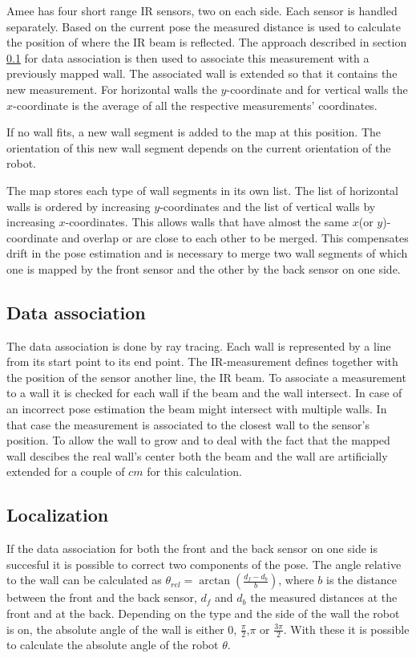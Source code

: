 Amee has four short range IR sensors, two on each side. Each sensor is handled separately. Based on the current pose the measured distance is used to calculate the position of where the IR beam is reflected. The approach described in section \ref{subsec:dataAssoc} for data association is then used to associate this measurement with a previously mapped wall. The associated wall is extended so that it contains the new measurement. For horizontal walls the $y$-coordinate and for vertical walls the $x$-coordinate is the average of all the respective measurements' coordinates. 

If no wall fits, a new wall segment is added to the map at this position. The orientation of this new wall segment depends on the current orientation of the robot.

The map stores each type of wall segments in its own list. The list of horizontal walls is ordered by increasing $y$-coordinates and the list of vertical walls by increasing $x$-coordinates. This allows walls that have almost the same $x$(or $y$)-coordinate and overlap or are close to each other to be merged. This compensates drift in the pose estimation and is necessary to merge two wall segments of which one is mapped by the front sensor and the other by the back sensor on one side. 

\subsection{Data association}
\label{subsec:dataAssoc}
The data association is done by ray tracing. Each wall is represented by a line from its start point to its end point. The IR-measurement defines together with the position of the sensor another line, the IR beam. To associate a measurement to a wall it is checked for each wall if the beam and the wall intersect. In case of an incorrect pose estimation the beam might intersect with multiple walls. In that case the measurement is associated to the closest wall to the sensor's position. To allow the wall to grow and to deal with the fact that the mapped wall descibes the real wall's center both the beam and the wall are artificially extended for a couple of $cm$ for this calculation.

\subsection{Localization}
\label{subsec:Localization}
If the data association for both the front and the back sensor on one side is succesful it is possible to correct two components of the pose. The angle relative to the wall can be calculated as $\theta_{rel} = \arctan(\frac{d_{f} - d_{b}}{b})$, where $b$ is the distance between the front and the back sensor, $d_f$ and $d_b$ the measured distances at the front and at the back. Depending on the type and the side of the wall the robot is on, the absolute angle of the wall is either $0$, $\frac{\pi}{2}$,$\pi$ or $\frac{3 \pi}{2}$. With these it is possible to calculate the absolute angle of the robot $\theta$.

